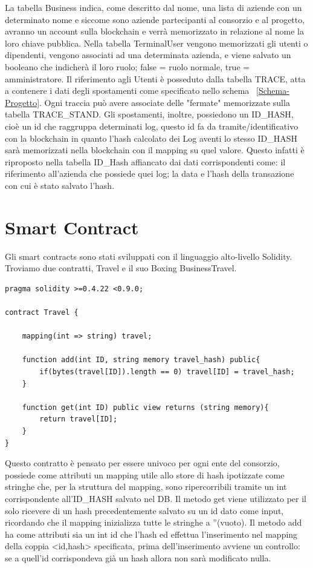 \documentclass[11pt,a4paper,titlepage,twoside,openright]{report}
\begin{document}
La tabella Business indica, come descritto dal nome, una lista di aziende con un determinato nome e siccome sono aziende partecipanti al consorzio e al progetto, avranno un account sulla blockchain e verrà memorizzato in relazione al nome la loro chiave pubblica. Nella tabella TerminalUser vengono memorizzati gli utenti o dipendenti, vengono associati ad una determinata azienda, e viene salvato un booleano che indicherà il loro ruolo; false = ruolo normale, true = amministratore. Il riferimento agli Utenti è posseduto dalla tabella TRACE, atta a contenere i dati degli spostamenti come specificato nello schema ~\ref{Schema-Progetto}. Ogni traccia può avere associate delle "fermate" memorizzate sulla tabella TRACE\_STAND. Gli spostamenti, inoltre, possiedono un ID\_HASH, cioè un id che raggruppa determinati log, questo id fa da tramite/identificativo con la blockchain in quanto l'hash calcolato dei Log aventi lo stesso ID\_HASH sarà memorizzati nella blockchain con il mapping su quel valore. Questo infatti è riproposto nella tabella ID\_Hash affiancato dai dati corrispondenti come: il riferimento all'azienda che possiede quei log; la data e l'hash della transazione con cui è stato salvato l'hash.

\section{Smart Contract}
Gli smart contracts sono stati sviluppati con il linguaggio alto-livello Solidity. Troviamo due contratti, Travel e il suo Boxing BusinessTravel.
\begin{lstlisting}[language=Solidity]
pragma solidity >=0.4.22 <0.9.0;

contract Travel {

    mapping(int => string) travel;

    function add(int ID, string memory travel_hash) public{
        if(bytes(travel[ID]).length == 0) travel[ID] = travel_hash;
    }

    function get(int ID) public view returns (string memory){
        return travel[ID];
    }
}
\end{lstlisting}
Questo contratto è pensato per essere univoco per ogni ente del consorzio, possiede come attributi un mapping utile allo store di hash ipotizzate come stringhe che, per la struttura del mapping, sono ripercorribili tramite un int corrispondente all'ID\_HASH salvato nel DB. Il metodo get viene utilizzato per il solo ricevere di un hash precedentemente salvato su un id dato come input, ricordando che il mapping inizializza tutte le stringhe a ''(vuoto). Il metodo add ha come attributi sia un int id che l'hash ed effettua l'inserimento nel mapping della coppia <id,hash> specificata, prima dell'inserimento avviene un controllo: se a quell'id corrispondeva già un hash allora non sarà modificato nulla.
\end{document}
